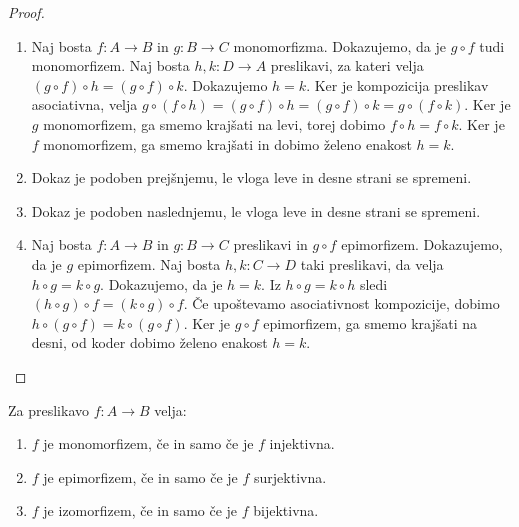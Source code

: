 \begin{proof}
  \begin{enumerate}
  \item Naj bosta $f : A \to B$ in $g : B \to C$ monomorfizma. Dokazujemo, da je
    $g \circ f$ tudi monomorfizem. Naj bosta $h, k : D \to A$ preslikavi, za kateri velja
    $(g \circ f) \circ h = (g \circ f) \circ k$. Dokazujemo $h = k$. Ker je kompozicija
    preslikav asociativna, velja
    $g \circ (f \circ h) = (g \circ f) \circ h = (g \circ f) \circ k = g \circ (f \circ k)$.
    Ker je $g$ monomorfizem, ga smemo krajšati na levi, torej dobimo
    $f \circ h = f \circ k$. Ker je $f$ monomorfizem, ga smemo krajšati in dobimo želeno
    enakost $h = k$.

  \item Dokaz je podoben prejšnjemu, le vloga leve in desne strani se spremeni.

  \item Dokaz je podoben naslednjemu, le vloga leve in desne strani se spremeni.

  \item Naj bosta $f : A \to B$ in $g : B \to C$ preslikavi in $g \circ f$ epimorfizem.
    Dokazujemo, da je $g$ epimorfizem. Naj bosta $h, k : C \to D$ taki preslikavi, da
    velja $h \circ g = k \circ g$. Dokazujemo, da je $h = k$. Iz $h \circ g = k \circ h$
    sledi $(h \circ g) \circ f = (k \circ g) \circ f$. Če upoštevamo asociativnost
    kompozicije, dobimo $h \circ (g \circ f) = k \circ (g \circ f)$. Ker je $g \circ f$
    epimorfizem, ga smemo krajšati na desni, od koder dobimo želeno enakost $h = k$.
  \end{enumerate}
\end{proof}


\begin{izrek}
  Za preslikavo $f : A \to B$ velja:
  \begin{enumerate}
  \item $f$ je monomorfizem, če in samo če je $f$ injektivna.
  \item $f$ je epimorfizem, če in samo če je $f$ surjektivna.
  \item $f$ je izomorfizem, če in samo če je $f$ bijektivna.
  \end{enumerate}
\end{izrek}


